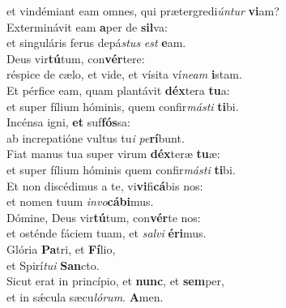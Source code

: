 \oddverse et vindémiant eam omnes, qui prætergredi\textit{ún}\textit{tur} \textbf{vi}am?\\
\evenverse Exterminávit eam \textbf{a}per de \textbf{sil}va:~\*\\
\evenverse et singuláris ferus depá\textit{stus} \textit{est} \textbf{e}am.\\
\oddverse Deus vir\textbf{tú}tum, con\textbf{vér}tere:~\*\\
\oddverse réspice de cælo, et vide, et vísita ví\textit{ne}\textit{am} \textbf{i}stam.\\
\evenverse Et pérfice eam, quam plantávit \textbf{déx}tera \textbf{tu}a:~\*\\
\evenverse et super fílium hóminis, quem confir\textit{má}\textit{sti} \textbf{ti}bi.\\
\oddverse Incénsa igni, \textbf{et} suf\textbf{fós}sa:~\*\\
\oddverse ab increpatióne vultus tu\textit{i} \textit{pe}\textbf{rí}bunt.\\
\evenverse Fiat manus tua super virum \textbf{déx}teræ \textbf{tu}æ:~\*\\
\evenverse et super fílium hóminis quem confir\textit{má}\textit{sti} \textbf{ti}bi.\\
\oddverse Et non discédimus a te, vi\textbf{vi}fi\textbf{cá}bis nos:~\*\\
\oddverse et nomen tuum \textit{in}\textit{vo}\textbf{cá}\textbf{bi}mus.\\
\evenverse Dómine, Deus vir\textbf{tú}tum, con\textbf{vér}te nos:~\*\\
\evenverse et osténde fáciem tuam, et \textit{sal}\textit{vi} \textbf{é}\textbf{ri}mus.\\
\oddverse Glória \textbf{Pa}tri, et \textbf{Fí}lio,~\*\\
\oddverse et Spirí\textit{tu}\textit{i} \textbf{San}cto.\\
\evenverse Sicut erat in princípio, et \textbf{nunc}, et \textbf{sem}per,~\*\\
\evenverse et in sǽcula sæcu\textit{ló}\textit{rum}. \textbf{A}men.\\

